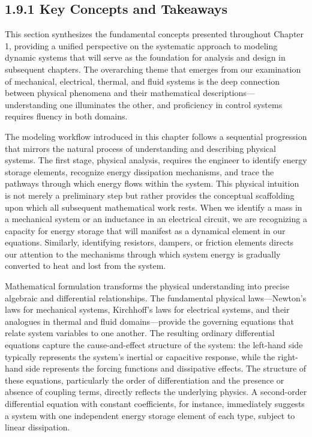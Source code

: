 \subsection{1.9.1 Key Concepts and Takeaways}

This section synthesizes the fundamental concepts presented throughout Chapter 1, providing a unified perspective on the systematic approach to modeling dynamic systems that will serve as the foundation for analysis and design in subsequent chapters. The overarching theme that emerges from our examination of mechanical, electrical, thermal, and fluid systems is the deep connection between physical phenomena and their mathematical descriptions---understanding one illuminates the other, and proficiency in control systems requires fluency in both domains.

The modeling workflow introduced in this chapter follows a sequential progression that mirrors the natural process of understanding and describing physical systems. The first stage, physical analysis, requires the engineer to identify energy storage elements, recognize energy dissipation mechanisms, and trace the pathways through which energy flows within the system. This physical intuition is not merely a preliminary step but rather provides the conceptual scaffolding upon which all subsequent mathematical work rests. When we identify a mass in a mechanical system or an inductance in an electrical circuit, we are recognizing a capacity for energy storage that will manifest as a dynamical element in our equations. Similarly, identifying resistors, dampers, or friction elements directs our attention to the mechanisms through which system energy is gradually converted to heat and lost from the system.

Mathematical formulation transforms the physical understanding into precise algebraic and differential relationships. The fundamental physical laws---Newton's laws for mechanical systems, Kirchhoff's laws for electrical systems, and their analogues in thermal and fluid domains---provide the governing equations that relate system variables to one another. The resulting ordinary differential equations capture the cause-and-effect structure of the system: the left-hand side typically represents the system's inertial or capacitive response, while the right-hand side represents the forcing functions and dissipative effects. The structure of these equations, particularly the order of differentiation and the presence or absence of coupling terms, directly reflects the underlying physics. A second-order differential equation with constant coefficients, for instance, immediately suggests a system with one independent energy storage element of each type, subject to linear dissipation.


